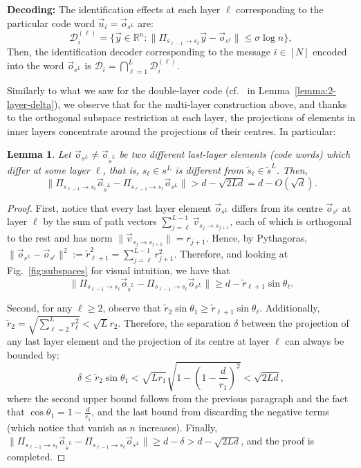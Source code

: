 \documentclass[10pt,conference]{IEEEtran}
\newtheorem{lemma}[theorem]{Lemma}
\newcommand{\1}{\mathds{1}}
\newcommand{\RR}{\mathbb{R}}
\newcommand{\cD}{\mathcal{D}}
\begin{document}
\noindent\textbf{Decoding:} The identification effects at each layer $\ell$ corresponding to the particular code word $\vec u_i=\vec o_{s^L}$ are:
\begin{equation}\label{eq:decoder}
\cD_{i}^{(\ell)}=\{\vec{y}\in\RR^n:\|\Pi_{s_{\ell-1}\to s_{\ell}}\vec{y}-\vec{o}_{s^\ell}\|\leq\sigma\log n\},
\end{equation}
Then, the identification decoder corresponding to the message $i\in[N]$ encoded into the word $\vec o_{s^L}$ is $\cD_i=\bigcap_{\ell=1}^L\cD_{i}^{(\ell)}$. 

Similarly to what we saw for the double-layer code (cf.~ in Lemma~\ref{lemma:2-layer-delta}), we observe that for the multi-layer construction above, and thanks to the orthogonal subspace restriction at each layer, the projections of elements in inner layers concentrate around the projections of their centres. In particular:

\begin{lemma}\label{lemma:proj_dist}
Let $\vec o_{s^L}\neq\vec o_{\tilde s^L}$ be two different last-layer elements (code words) which differ at some layer $\ell$, that is, $s_\ell\in s^L$ is different from $\tilde s_\ell\in \tilde s^L$. Then,
\[
\|\Pi_{s_{\ell-1}\to s_\ell}\vec o_{\tilde s^L}-\Pi_{s_{\ell-1}\to s_\ell}\vec o_{s^L}\|> d-\sqrt{2Ld}=d-O(\sqrt{d}).
\]
\end{lemma}
\begin{proof}
First, notice that every last layer element $\vec o_{s^L}$ differs from its centre $\vec o_{s^\ell}$ at layer $\ell$ by the sum of path vectors $\sum_{j=\ell}^{L-1} \vec v_{s_j\to s_{j+1}}$, each of which is orthogonal to the rest and has norm $\|\vec v_{s_j\to s_{j+1}}\|=r_{j+1}$. Hence, by Pythagoras, $\|\vec o_{s^L}-\vec o_{s^\ell}\|^2:=\tilde r_{\ell+1}^2=\sum_{j=\ell}^{L-1} r_{j+1}^2$. Therefore, and looking at Fig.~\ref{fig:subspaces} for visual intuition, we have that 
\begin{equation}
\|\Pi_{s_{\ell-1}\to s_\ell}\vec o_{\tilde s^L}-\Pi_{s_{\ell-1}\to s_\ell}\vec o_{s^L}\|\geq d-\tilde r_{\ell+1}\sin\theta_\ell.
\end{equation}

Second, for any $\ell\geq 2$, observe that $\tilde r_{2}\sin\theta_1\geq\tilde r_{\ell+1}\sin\theta_\ell$. Additionally, $\tilde r_{2}=\sqrt{\sum_{\ell=2}^{L} r_{\ell}^2}<\sqrt{L}r_2$. Therefore, the separation $\delta$ between the projection of any last layer element and the projection of its centre at layer $\ell$ can always be bounded by:
\begin{equation}
\delta\leq\tilde r_2\sin\theta_1<\sqrt{Lr_1}\sqrt{1-\left(1-\frac{d}{r_1}\right)^2}<\sqrt{2Ld},
\end{equation}
where the second upper bound follows from the previous paragraph and the fact that $\cos \theta_1=1-\frac{d}{r_1}$, and the last bound from discarding the negative terms (which notice that vanish as $n$ increases).
Finally, $\|\Pi_{s_{\ell-1}\to s_\ell}\vec o_{\tilde s^L}-\Pi_{s_{\ell-1}\to s_\ell}\vec o_{s^L}\|\geq d-\delta>d-\sqrt{2Ld}$, and the proof is completed.
\end{proof}
\end{document}
